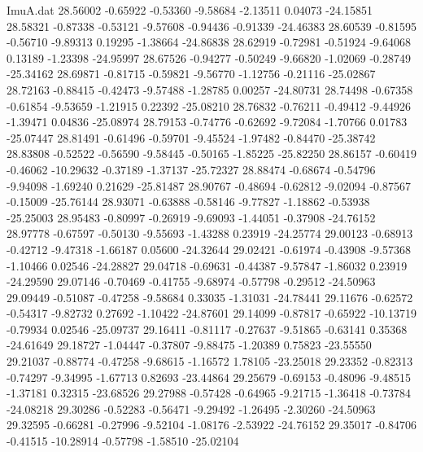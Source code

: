 \begin{filecontents}{ImuA.dat}
  28.56002   -0.65922   -0.53360   -9.58684   -2.13511    0.04073  -24.15851
  28.58321   -0.87338   -0.53121   -9.57608   -0.94436   -0.91339  -24.46383
  28.60539   -0.81595   -0.56710   -9.89313    0.19295   -1.38664  -24.86838
  28.62919   -0.72981   -0.51924   -9.64068    0.13189   -1.23398  -24.95997
  28.67526   -0.94277   -0.50249   -9.66820   -1.02069   -0.28749  -25.34162
  28.69871   -0.81715   -0.59821   -9.56770   -1.12756   -0.21116  -25.02867
  28.72163   -0.88415   -0.42473   -9.57488   -1.28785    0.00257  -24.80731
  28.74498   -0.67358   -0.61854   -9.53659   -1.21915    0.22392  -25.08210
  28.76832   -0.76211   -0.49412   -9.44926   -1.39471    0.04836  -25.08974
  28.79153   -0.74776   -0.62692   -9.72084   -1.70766    0.01783  -25.07447
  28.81491   -0.61496   -0.59701   -9.45524   -1.97482   -0.84470  -25.38742
  28.83808   -0.52522   -0.56590   -9.58445   -0.50165   -1.85225  -25.82250
  28.86157   -0.60419   -0.46062  -10.29632   -0.37189   -1.37137  -25.72327
  28.88474   -0.68674   -0.54796   -9.94098   -1.69240    0.21629  -25.81487
  28.90767   -0.48694   -0.62812   -9.02094   -0.87567   -0.15009  -25.76144
  28.93071   -0.63888   -0.58146   -9.77827   -1.18862   -0.53938  -25.25003
  28.95483   -0.80997   -0.26919   -9.69093   -1.44051   -0.37908  -24.76152
  28.97778   -0.67597   -0.50130   -9.55693   -1.43288    0.23919  -24.25774
  29.00123   -0.68913   -0.42712   -9.47318   -1.66187    0.05600  -24.32644
  29.02421   -0.61974   -0.43908   -9.57368   -1.10466    0.02546  -24.28827
  29.04718   -0.69631   -0.44387   -9.57847   -1.86032    0.23919  -24.29590
  29.07146   -0.70469   -0.41755   -9.68974   -0.57798   -0.29512  -24.50963
  29.09449   -0.51087   -0.47258   -9.58684    0.33035   -1.31031  -24.78441
  29.11676   -0.62572   -0.54317   -9.82732    0.27692   -1.10422  -24.87601
  29.14099   -0.87817   -0.65922  -10.13719   -0.79934    0.02546  -25.09737
  29.16411   -0.81117   -0.27637   -9.51865   -0.63141    0.35368  -24.61649
  29.18727   -1.04447   -0.37807   -9.88475   -1.20389    0.75823  -23.55550
  29.21037   -0.88774   -0.47258   -9.68615   -1.16572    1.78105  -23.25018
  29.23352   -0.82313   -0.74297   -9.34995   -1.67713    0.82693  -23.44864
  29.25679   -0.69153   -0.48096   -9.48515   -1.37181    0.32315  -23.68526
  29.27988   -0.57428   -0.64965   -9.21715   -1.36418   -0.73784  -24.08218
  29.30286   -0.52283   -0.56471   -9.29492   -1.26495   -2.30260  -24.50963
  29.32595   -0.66281   -0.27996   -9.52104   -1.08176   -2.53922  -24.76152
  29.35017   -0.84706   -0.41515  -10.28914   -0.57798   -1.58510  -25.02104

\end{filecontents}
